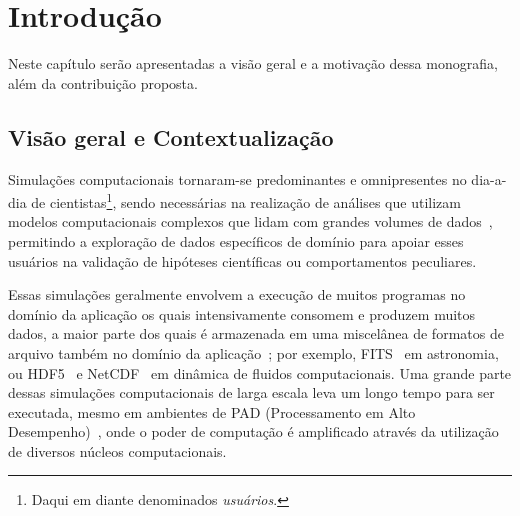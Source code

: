 
\chapter{Introdução}

Neste capítulo serão apresentadas a visão geral e a motivação dessa monografia, além da contribuição proposta.

\section{Visão geral e Contextualização}

Simulações computacionais tornaram-se predominantes e omnipresentes no dia-a-dia de cientistas\footnote{Daqui em diante denominados \textit{usuários}.}, sendo necessárias na realização de análises que utilizam modelos computacionais complexos que lidam com grandes volumes de dados~\cite{silva2015analyzing}, permitindo a exploração de dados específicos de domínio para apoiar esses usuários na validação de hipóteses científicas ou comportamentos peculiares.

Essas simulações geralmente envolvem a execução de muitos programas no domínio da aplicação os quais intensivamente consomem e produzem muitos dados, a maior parte dos quais é armazenada em uma miscelânea de formatos de arquivo também no domínio da aplicação~\cite{silva2015analyzing}; por exemplo,  FITS~\cite{greisen2002representations} em astronomia, ou  HDF5~\cite{folk1999hdf5} e  NetCDF~\cite{rew1990netcdf} em dinâmica de fluidos computacionais.
Uma grande parte dessas simulações computacionais de larga escala leva um longo tempo para ser executada, mesmo em ambientes de  PAD (Processamento em Alto Desempenho)~\cite{silva2017raw}, onde o poder de computação é amplificado através da utilização de diversos núcleos computacionais.


